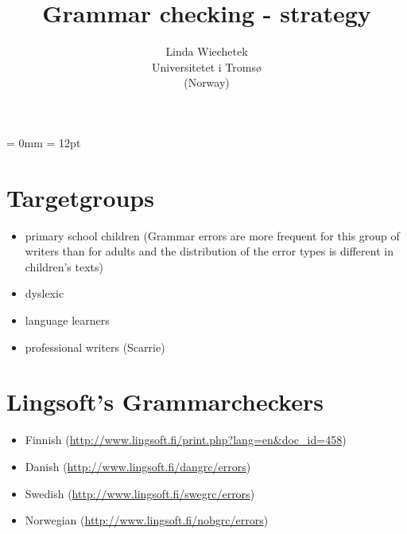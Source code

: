 \documentclass[a4paper,english,12pt]{article}
\begin{document}
\setcounter{secnumdepth}{3}
\setcounter{tocdepth}{3}
\begin{spacing}{1.0}


\newcommand{\tx}{\mbox{t\hspace{-.35em}-}} %
\newcommand{\txx}{\mbox{T\hspace{-.5em}-}} 




\title{{\Large Grammar checking - strategy}}


\author{Linda Wiechetek \\
		Universitetet i Tromsø \\
			(Norway)}
\date{}
\maketitle

\thispagestyle{empty}
\tableofcontents 
\thispagestyle{empty} %

\newpage

\setcounter{page}{1} %

\parindent = 0mm
\parskip = 12pt

\section{Targetgroups}

\begin{itemize}
\item primary school children (Grammar errors are more frequent for this group of writers than for adults and the distribution of the error types is different in children’s texts) \citet{Sofkova2003}
\item dyslexic \citet{Pedler2007}
\item language learners
\item professional writers (Scarrie)
\end{itemize}


\section{Lingsoft's Grammarcheckers}

\begin{itemize}
\item Finnish (\url{http://www.lingsoft.fi/print.php?lang=en&doc_id=458})
\item Danish (\url{http://www.lingsoft.fi/dangrc/errors})
\item Swedish (\url{http://www.lingsoft.fi/swegrc/errors})
\item Norwegian (\url{http://www.lingsoft.fi/nobgrc/errors})
\end{itemize}


\end{spacing}
\end{document}
